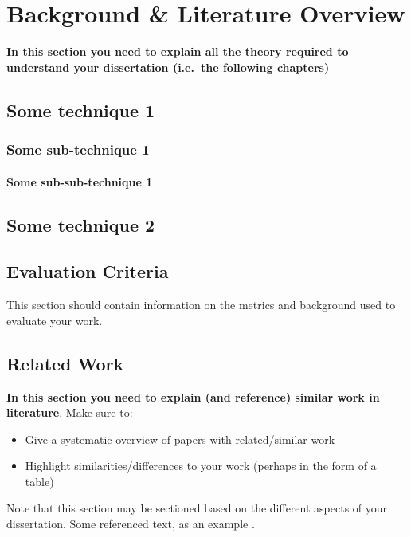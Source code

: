 \chapter{Background \& Literature Overview}
\textbf{In this section you need to explain all the theory required to understand your dissertation (i.e.\ the following chapters)}
\section{Some technique 1}
\blindtext
\subsection{Some sub-technique 1}
\blindtext
\subsubsection{Some sub-sub-technique 1}
\blindtext
\section{Some technique 2}
\blindtext
\section{Evaluation Criteria}
This section should contain information on the metrics and background used to evaluate your work.
\section{Related Work}
\textbf{In this section you need to explain (and reference) similar work in literature}.  Make sure to:

\begin{itemize}
 \item Give a systematic overview of papers with related/similar work
 \item Highlight similarities/differences to your work (perhaps in the form of a table)
\end{itemize}

Note that this section may be sectioned based on the different aspects of your dissertation.  Some referenced text, as an example \citep{Arrighi2003, WithersMartinez2012, Ebejer2016}.



